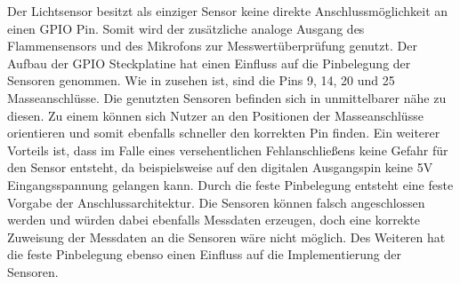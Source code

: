 Der Lichtsensor besitzt als einziger Sensor keine direkte Anschlussmöglichkeit an einen \ac{GPIO} Pin. Somit wird der zusätzliche analoge Ausgang des Flammensensors und des Mikrofons zur Messwertüberprüfung genutzt. Der Aufbau der \ac{GPIO} Steckplatine hat einen Einfluss auf die Pinbelegung der Sensoren genommen. Wie in  zusehen ist, sind die Pins 9, 14, 20 und 25 Masseanschlüsse. Die genutzten Sensoren befinden sich in unmittelbarer nähe zu diesen. Zu einem können sich Nutzer an den Positionen der Masseanschlüsse orientieren und somit ebenfalls schneller den korrekten Pin finden. Ein weiterer Vorteils ist, dass im Falle eines versehentlichen Fehlanschließens keine Gefahr für den Sensor entsteht, da beispielsweise auf den digitalen Ausgangspin keine 5V Eingangsspannung gelangen kann. Durch die feste Pinbelegung entsteht eine feste Vorgabe der Anschlussarchitektur. Die Sensoren können falsch angeschlossen werden und würden dabei ebenfalls Messdaten erzeugen, doch eine korrekte Zuweisung der Messdaten an die Sensoren wäre nicht möglich. Des Weiteren hat die feste Pinbelegung ebenso einen Einfluss auf die Implementierung der Sensoren. 
